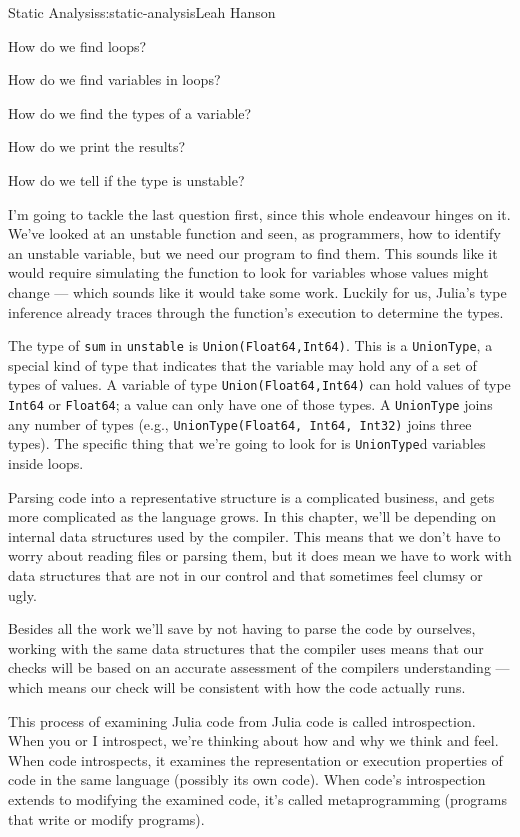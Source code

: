 \begin{aosachapter}{Static Analysis}{s:static-analysis}{Leah Hanson}
\begin{aosaitemize}

\item
  How do we find loops?
\item
  How do we find variables in loops?
\item
  How do we find the types of a variable?
\item
  How do we print the results?
\item
  How do we tell if the type is unstable?
\end{aosaitemize}

I'm going to tackle the last question first, since this whole endeavour
hinges on it. We've looked at an unstable function and seen, as
programmers, how to identify an unstable variable, but we need our
program to find them. This sounds like it would require simulating the
function to look for variables whose values might change --- which
sounds like it would take some work. Luckily for us, Julia's type
inference already traces through the function's execution to determine
the types.

The type of \texttt{sum} in \texttt{unstable} is
\texttt{Union(Float64,Int64)}. This is a \texttt{UnionType}, a special
kind of type that indicates that the variable may hold any of a set of
types of values. A variable of type \texttt{Union(Float64,Int64)} can
hold values of type \texttt{Int64} or \texttt{Float64}; a value can only
have one of those types. A \texttt{UnionType} joins any number of types
(e.g., \texttt{UnionType(Float64, Int64, Int32)} joins three types). The
specific thing that we're going to look for is \texttt{UnionType}d
variables inside loops.

Parsing code into a representative structure is a complicated business,
and gets more complicated as the language grows. In this chapter, we'll
be depending on internal data structures used by the compiler. This
means that we don't have to worry about reading files or parsing them,
but it does mean we have to work with data structures that are not in
our control and that sometimes feel clumsy or ugly.

Besides all the work we'll save by not having to parse the code by
ourselves, working with the same data structures that the compiler uses
means that our checks will be based on an accurate assessment of the
compilers understanding --- which means our check will be consistent
with how the code actually runs.

This process of examining Julia code from Julia code is called
introspection. When you or I introspect, we're thinking about how and
why we think and feel. When code introspects, it examines the
representation or execution properties of code in the same language
(possibly its own code). When code's introspection extends to modifying
the examined code, it's called metaprogramming (programs that write or
modify programs).


\end{aosachapter}
